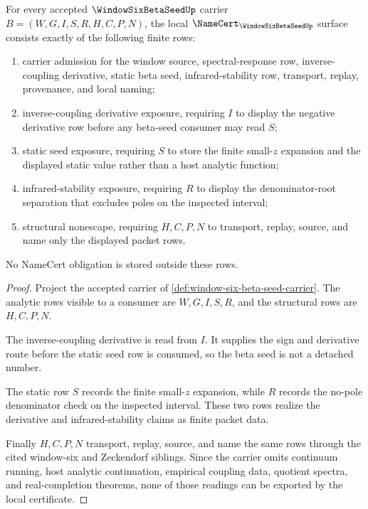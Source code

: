 \begin{theorem}
\label{thm:window-six-beta-seed-namecert-obligations}
For every accepted $\WindowSixBetaSeedUp$ carrier $B=(W,G,I,S,R,H,C,P,N)$, the local $\NameCert_{\WindowSixBetaSeedUp}$ surface consists exactly of the following finite rows:
\begin{enumerate}
\item carrier admission for the window source, spectral-response row, inverse-coupling derivative, static beta seed, infrared-stability row, transport, replay, provenance, and local naming;
\item inverse-coupling derivative exposure, requiring $I$ to display the negative derivative row before any beta-seed consumer may read $S$;
\item static seed exposure, requiring $S$ to store the finite small-$z$ expansion and the displayed static value rather than a host analytic function;
\item infrared-stability exposure, requiring $R$ to display the denominator-root separation that excludes poles on the inspected interval;
\item structural nonescape, requiring $H,C,P,N$ to transport, replay, source, and name only the displayed packet rows.
\end{enumerate}
No NameCert obligation is stored outside these rows.
\end{theorem}
\begin{proof}
Project the accepted carrier of \autoref{def:window-six-beta-seed-carrier}. The analytic rows visible to a consumer are $W,G,I,S,R$, and the structural rows are $H,C,P,N$.

The inverse-coupling derivative is read from $I$. It supplies the sign and derivative route before the static seed row is consumed, so the beta seed is not a detached number.

The static row $S$ records the finite small-$z$ expansion, while $R$ records the no-pole denominator check on the inspected interval. These two rows realize the derivative and infrared-stability claims as finite packet data.

Finally $H,C,P,N$ transport, replay, source, and name the same rows through the cited window-six and Zeckendorf siblings. Since the carrier omits continuum running, host analytic continuation, empirical coupling data, quotient spectra, and real-completion theorems, none of those readings can be exported by the local certificate.
\end{proof}

